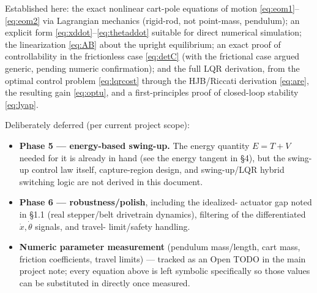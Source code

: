 \documentclass[11pt]{article}
\begin{document}
Established here: the exact nonlinear cart-pole equations of motion
\eqref{eq:eom1}--\eqref{eq:eom2} via Lagrangian mechanics (rigid-rod, not
point-mass, pendulum); an explicit form
\eqref{eq:xddot}--\eqref{eq:thetaddot} suitable for direct numerical
simulation; the linearization \eqref{eq:AB} about the upright equilibrium;
an exact proof of controllability in the frictionless case
\eqref{eq:detC} (with the frictional case argued generic, pending numeric
confirmation); and the full LQR derivation, from the optimal control
problem \eqref{eq:lqrcost} through the HJB/Riccati derivation
\eqref{eq:are}, the resulting gain \eqref{eq:optu}, and a first-principles
proof of closed-loop stability \eqref{eq:lyap}.

Deliberately deferred (per current project scope):
\begin{itemize}[leftmargin=*]
  \item \textbf{Phase 5 — energy-based swing-up.} The energy quantity
  $E=T+V$ needed for it is already in hand (see the energy tangent in
  \S4), but the swing-up control law itself, capture-region design, and
  swing-up/LQR hybrid switching logic are not derived in this document.
  \item \textbf{Phase 6 — robustness/polish}, including the idealized-
  actuator gap noted in \S1.1 (real stepper/belt drivetrain dynamics),
  filtering of the differentiated $\dot x,\dot\theta$ signals, and travel-
  limit/safety handling.
  \item \textbf{Numeric parameter measurement} (pendulum mass/length,
  cart mass, friction coefficients, travel limits) — tracked as an Open
  TODO in the main project note; every equation above is left symbolic
  specifically so those values can be substituted in directly once
  measured.
\end{itemize}
\end{document}
